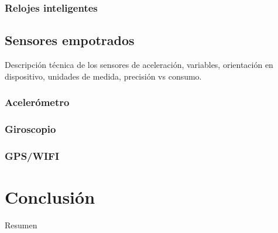 \subsubsection{Relojes inteligentes}

\subsection{Sensores empotrados}

\label{sec433:sensores-empotrados}Descripción técnica de los sensores
de aceleración, variables, orientación en dispositivo, unidades de
medida, precisión vs consumo.

\subsubsection{Acelerómetro}

\subsubsection{Giroscopio}

\subsubsection{GPS/WIFI}

\section{Conclusión}

Resumen
